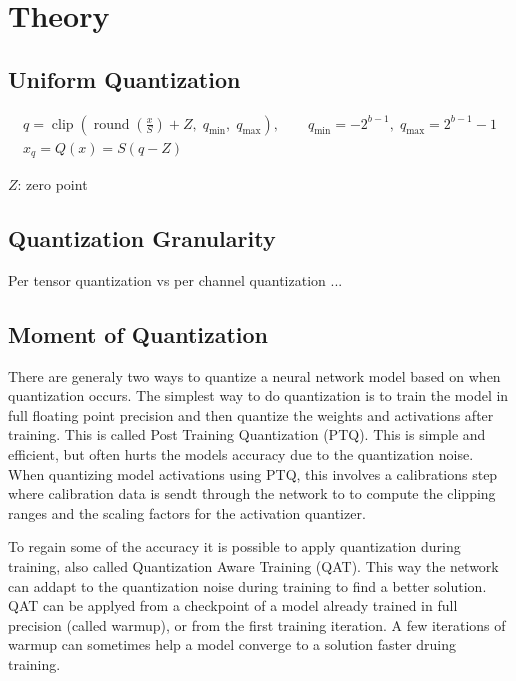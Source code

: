\section{Theory} \label{sec:Theory}

\subsection{Uniform Quantization}

\begin{gather} \label{uniform_quant}
    q = \operatorname{clip}\!\left(\operatorname{round}\!\left(\tfrac{x}{S}\right) + Z,\; q_{\min},\; q_{\max}\right), \qquad q_{\min}= -2^{b-1},\; q_{\max}=2^{b-1}-1 \\[2pt]
    x_q = Q(x) = S (q - Z)
\end{gather}

$Z$: zero point


\subsection{Quantization Granularity}

Per tensor quantization vs per channel quantization ...
\subsection{Moment of Quantization}

There are generaly two ways to quantize a neural network model based on when quantization occurs.
The simplest way to do quantization is to train the model in full floating point precision and then quantize the weights and activations after training.
This is called Post Training Quantization (PTQ). This is simple and efficient, but often hurts the models accuracy due to the quantization noise.
When quantizing model activations using PTQ, this involves a calibrations step where calibration data is sendt through the network to 
to compute the clipping ranges and the scaling factors for the activation quantizer.

To regain some of the accuracy it is possible to apply quantization during training, also called Quantization Aware Training (QAT).
This way the network can addapt to the quantization noise during training to find a better solution.
QAT can be applyed from a checkpoint of a model already trained in full precision (called warmup), or from the first training iteration.
A few iterations of warmup can sometimes help a model converge to a solution faster druing training.

